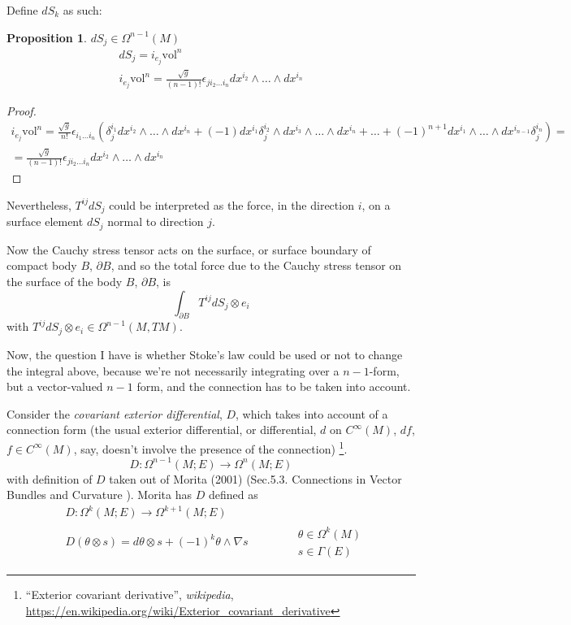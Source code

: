 \documentclass[twoside,landscape,10pt]{amsart}
\theoremstyle{plain}
\newtheorem{proposition}{Proposition}
\theoremstyle{definition}
\theoremstyle{remark}
\begin{document}
\begin{multicols*}{2}
Define $dS_k$ as such:
\begin{proposition}
  $dS_j \in \Omega^{n-1}(M)$ 
\begin{equation}
  \begin{gathered}
    dS_j = i_{e_j}\text{vol}^n \\ 
    i_{e_j}\text{vol}^n = \frac{\sqrt{g}}{ (n-1)!} \epsilon_{ji_2 \dots i_n} dx^{i_2} \wedge \dots \wedge dx^{i_n}
\end{gathered}
\end{equation}
\end{proposition}
\begin{proof}
  \[
\begin{gathered}
  i_{e_j}\text{vol}^n = \frac{\sqrt{g}}{n!}\epsilon_{i_1 \dots i_n}(\delta^{i_1}_j dx^{i_2} \wedge \dots \wedge dx^{i_n} + (-1) dx^{i_1} \delta^{i_2}_j \wedge dx^{i_3} \wedge \dots \wedge dx^{i_n} + \dots + (-1)^{n+1} dx^{i_1} \wedge \dots \wedge dx^{i_{n-1}} \delta^{i_n}_j ) = \\
  = \frac{\sqrt{g}}{(n-1)!} \epsilon_{ji_2 \dots i_n} dx^{i_2} \wedge \dots \wedge dx^{i_n}
\end{gathered}
\]
\end{proof}

Nevertheless, $T^{ij}dS_j$ could be interpreted as the force, in the direction $i$, on a surface element $dS_j$ normal to direction $j$.  

Now the Cauchy stress tensor acts on the surface, or surface boundary of compact body $B$, $\partial B$, and so the total force due to the Cauchy stress tensor on the surface of the body $B$, $\partial B$, is 
\[
\int_{\partial B} T^{ij} dS_j \otimes e_i
\]
with $T^{ij} dS_j \otimes e_i \in \Omega^{n-1}(M,TM)$.  

Now, the question I have is whether Stoke's law could be used or not to change the integral above, because we're not necessarily integrating over a $n-1$-form, but a vector-valued $n-1$ form, and the connection has to be taken into account.  


Consider the \emph{covariant exterior differential}, $D$, which takes into account of a connection form (the usual exterior differential, or differential, $d$ on $C^{\infty}(M)$, $df$, $f\in C^{\infty}(M)$, say, doesn't involve the presence of the connection) \footnote{``Exterior covariant derivative'', \emph{wikipedia}, \url{https://en.wikipedia.org/wiki/Exterior_covariant_derivative}}. 
\[
D: \Omega^{n-1}(M;E) \to \Omega^n(M;E)
\]
with definition of $D$ taken out of Morita (2001) (Sec.5.3. Connections in Vector Bundles and Curvature \cite{SMorita2001}).  Morita has $D$ defined as 
\[
\begin{aligned}
  & D: \Omega^k(M;E) \to \Omega^{k+1}(M;E) \\ 
  & D(\theta \otimes s) = d\theta \otimes s + (-1)^k \theta \wedge \nabla s \quad \quad \quad \, \begin{aligned}
    & \theta \in \Omega^k(M) \\
    & s \in \Gamma(E) \end{aligned}
\end{aligned}
\]  


\end{multicols*}
\end{document}
